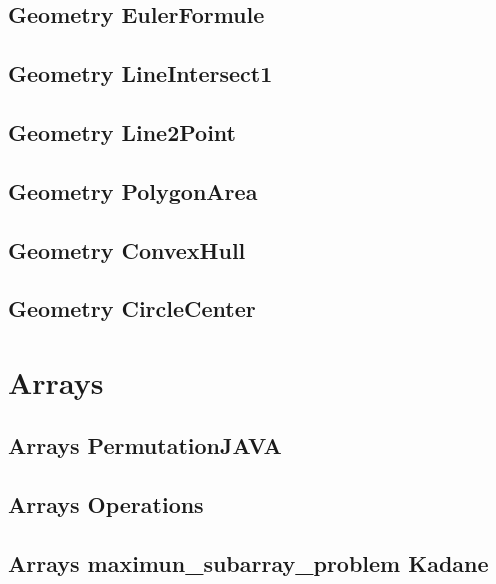 \subsection{Geometry EulerFormule}
\raggedbottom
\hrulefill
\subsection{Geometry LineIntersect1}
\raggedbottom
\hrulefill
\subsection{Geometry Line2Point}
\raggedbottom
\hrulefill
\subsection{Geometry PolygonArea}
\raggedbottom
\hrulefill
\subsection{Geometry ConvexHull}
\raggedbottom
\hrulefill
\subsection{Geometry CircleCenter}
\raggedbottom
\hrulefill

\section{Arrays}
\subsection{Arrays PermutationJAVA}
\raggedbottom
\hrulefill
\subsection{Arrays Operations}
\raggedbottom
\hrulefill
\subsection{Arrays maximun_subarray_problem Kadane}
\raggedbottom
\hrulefill
